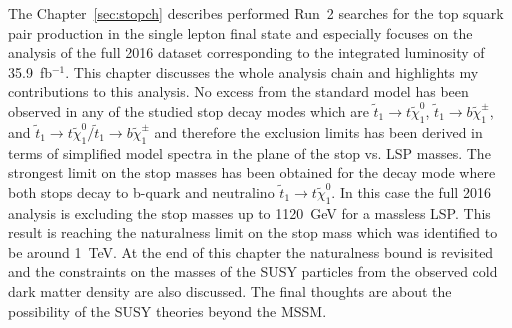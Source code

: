 The Chapter~\ref{sec:stopch} describes performed Run~2 searches for the top squark pair production in the single lepton final state and especially focuses on the analysis of the full 2016 dataset corresponding to the integrated luminosity of 35.9~fb$^{-1}$. This chapter discusses the whole analysis chain and highlights my contributions to this analysis. No excess from the standard model has been observed in any of the studied stop decay modes which are $\tilde{t}_{1} \to t  \tilde{\chi}^{0}_{1} $, $\tilde{t}_{1} \to b  \tilde{\chi}^{\pm}_{1}$, and $ \tilde{t}_{1} \to t  \tilde{\chi}^{0}_{1}/\tilde{t}_{1} \to b  \tilde{\chi}^{\pm}_{1} $ and therefore the exclusion limits has been derived in terms of simplified model spectra in the plane of the stop vs. LSP masses. The strongest limit on the stop masses has been obtained for the decay mode where both stops decay to b-quark and neutralino $\tilde{t}_{1} \to t  \tilde{\chi}^{0}_{1}$. In this case the full 2016 analysis is excluding the stop masses up to 1120~GeV for a massless LSP. This result is reaching the naturalness limit on the stop mass which was identified to be around 1~TeV. At the end of this chapter the naturalness bound is revisited and the constraints on the masses of the SUSY particles from the observed cold dark matter density are also discussed. The final thoughts are about the possibility of the SUSY theories beyond the MSSM.
